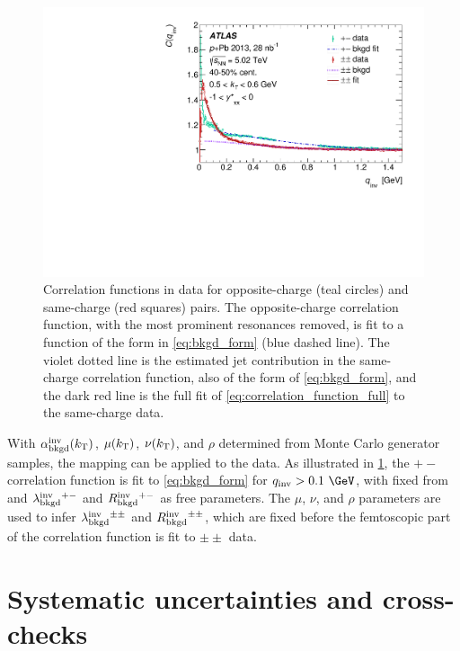 \begin{figure}[t]
\centering
\includegraphics{cqinv_charge_comp_cent6_kt4_kys1.pdf}
\caption{Correlation functions in \pPb data for opposite-charge (teal circles) and same-charge (red squares) pairs. The opposite-charge correlation function, with the most prominent resonances removed, is fit to a function of the form in \cref{eq:bkgd_form} (blue dashed line). The violet dotted line is the estimated jet contribution in the same-charge correlation function, also of the form of \cref{eq:bkgd_form}, and the dark red line is the full fit of \cref{eq:correlation_function_full} to the same-charge data.}
\label{fig:hp_example}
\end{figure}

With $\alpha_{\mathrm{bkgd}}^{\mathrm{inv}}(k_\mathrm{T})$, $\mu(k_\mathrm{T})$, $\nu(k_\mathrm{T})$, and $\rho$ determined from Monte Carlo generator samples, the mapping can be applied to the \pPb data.
As illustrated in \cref{fig:hp_example}, the $+-$ correlation function is fit to \cref{eq:bkgd_form} for $\qinv > 0.1~\GeV$, with \abkgd fixed from \PYEight and $\lambda_{\mathrm{bkgd}}^{\mathrm{inv}}{}^{+-}$ and $R_{\mathrm{bkgd}}^{\mathrm{inv}}{}^{+-}$ as free parameters.
The $\mu$, $\nu$, and $\rho$ parameters are used to infer $\lambda_{\mathrm{bkgd}}^{\mathrm{inv}}{}^{\pm\pm}$ and $R_{\mathrm{bkgd}}^{\mathrm{inv}}{}^{\pm\pm}$, which are fixed before the femtoscopic part of the correlation function is fit to $\pm\pm$ data.

\FloatBarrier


\section{Systematic uncertainties and cross-checks}
\label{sec:systematics}

